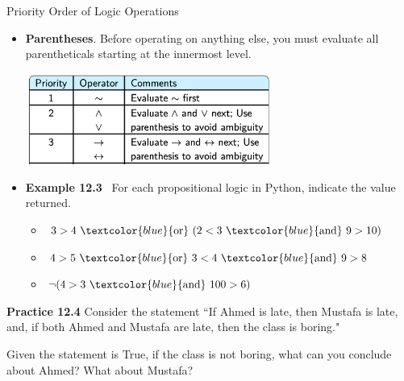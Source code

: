 \documentclass[aspectratio=169]{beamer}
\providecommand{\Blue}[1]{\textcolor{blue}{#1}}
\begin{document}
\begin{frame}[plain]{Priority Order of Logic Operations}
 
 
 \begin{itemize}
   \item {\bf Parentheses}. Before operating on anything else, 
    you must evaluate all parentheticals starting at the innermost level.
     \begin{center}
       \includegraphics[height=3cm]{./img/lecture12-fig1.png}
    \end{center}
 \medskip
 
 
   \item {\bf Example 12.3}%
  \  For each propositional logic in Python, indicate the value returned.
 \begin{itemize}
  \item $3 > 4 \ \Blue{\mathrm{or}}\ (2 < 3 \ \Blue{\mathrm{and}}\ 9 > 10)$ %
  \item $4 > 5 \ \Blue{\mathrm{or}}\  3 < 4 \ \Blue{\mathrm{and}}\ 9 > 8$  %
  \item $\neg ( 4 > 3 \ \Blue{\mathrm{and}}\ 100 > 6)$  %
 \end{itemize}
 \end{itemize}
 
\end{frame}

\begin{frame}[plain]{}

 {\bf Practice 12.4} Consider the statement
   ``If Ahmed is late, then Mustafa is late, and, 
 if both Ahmed and Mustafa are late, then the class is boring."
 \smallskip
 
 Given the statement is True, if the class is not boring, 
 what can you conclude about Ahmed? 
    What about Mustafa?

\vspace{2in}

\end{frame}
\end{document}
